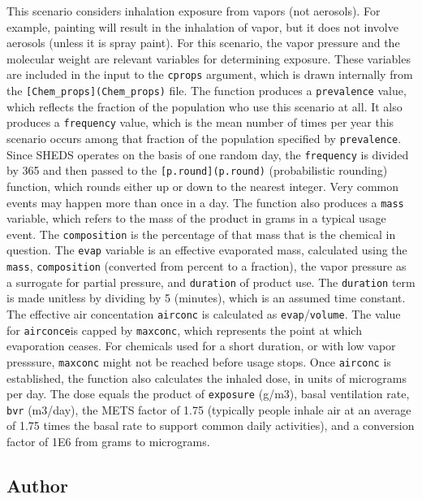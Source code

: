 \documentclass[
]{article}
\begin{document}
This scenario considers inhalation exposure from vapors (not aerosols).
For example, painting will result in the inhalation of vapor, but it
does not involve aerosols (unless it is spray paint). For this scenario,
the vapor pressure and the molecular weight are relevant variables for
determining exposure. These variables are included in the input to the
\texttt{cprops} argument, which is drawn internally from the
\texttt{{[}Chem\_props{]}(Chem\_props)} file. The function produces a
\texttt{prevalence} value, which reflects the fraction of the population
who use this scenario at all. It also produces a \texttt{frequency}
value, which is the mean number of times per year this scenario occurs
among that fraction of the population specified by \texttt{prevalence}.
Since SHEDS operates on the basis of one random day, the
\texttt{frequency} is divided by 365 and then passed to the
\texttt{{[}p.round{]}(p.round)} (probabilistic rounding) function, which
rounds either up or down to the nearest integer. Very common events may
happen more than once in a day. The function also produces a
\texttt{mass} variable, which refers to the mass of the product in grams
in a typical usage event. The \texttt{composition} is the percentage of
that mass that is the chemical in question. The \texttt{evap} variable
is an effective evaporated mass, calculated using the \texttt{mass},
\texttt{composition} (converted from percent to a fraction), the vapor
pressure as a surrogate for partial pressure, and \texttt{duration} of
product use. The \texttt{duration} term is made unitless by dividing by
5 (minutes), which is an assumed time constant. The effective air
concentation \texttt{airconc} is calculated as
\texttt{evap}/\texttt{volume}. The value for \texttt{airconce}is capped
by \texttt{maxconc}, which represents the point at which evaporation
ceases. For chemicals used for a short duration, or with low vapor
presssure, \texttt{maxconc} might not be reached before usage stops.
Once \texttt{airconc} is established, the function also calculates the
inhaled dose, in units of micrograms per day. The dose equals the
product of \texttt{exposure} (g/m3), basal ventilation rate,
\texttt{bvr} (m3/day), the METS factor of 1.75 (typically people inhale
air at an average of 1.75 times the basal rate to support common daily
activities), and a conversion factor of 1E6 from grams to micrograms.

\hypertarget{author-12}{%
\subsection{Author}\label{author-12}}
\end{document}
